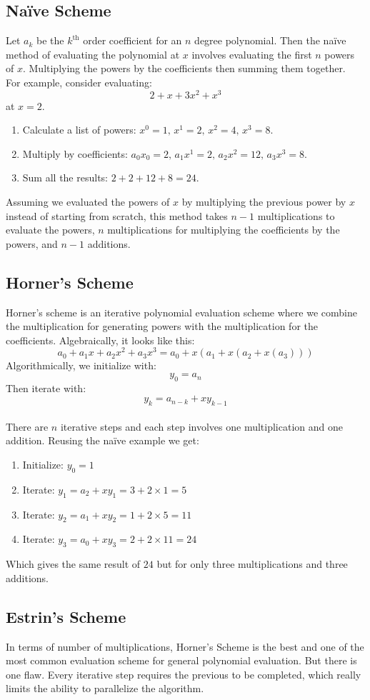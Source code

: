 \subsection{Naïve Scheme}
Let $a_k$ be the $k^\text{th}$ order coefficient for an $n$ degree polynomial.
Then the naïve method of evaluating the polynomial at $x$ involves evaluating the first $n$ powers of $x$.
Multiplying the powers by the coefficients then summing them together.
\\
For example, consider evaluating:
\[2+x+3x^2+x^3\]
at $x=2$.
\begin{enumerate}
	\item Calculate a list of powers: $x^0 = 1,\,x^1 = 2,\,x^2 = 4,\,x^3 = 8$.
	\item Multiply by coefficients: $a_0x_0 = 2,\,a_1x^1 = 2,\,a_2x^2 = 12,\, a_3x^3 = 8$.
	\item Sum all the results: $2+2+12+8 = 24$.
\end{enumerate}
Assuming we evaluated the powers of $x$ by multiplying the previous power by $x$ instead of starting from scratch,
this method takes $n-1$ multiplications to evaluate the powers,
$n$ multiplications for multiplying the coefficients by the powers,
and $n-1$ additions.

\subsection{Horner's Scheme}
Horner's scheme is an iterative polynomial evaluation scheme where we combine the multiplication for generating powers with the multiplication for the coefficients.
Algebraically, it looks like this:
\[a_0+a_1x+a_2x^2+a_3x^3 = a_0+x(a_1+x(a_2+x(a_3)))\]
Algorithmically, we initialize with: 
\[y_0 = a_n\]
Then iterate with:
\[y_k = a_{n-k}+xy_{k-1}\]
\\
There are $n$ iterative steps and each step involves one multiplication and one addition.
Reusing the naïve example we get:
\begin{enumerate}
	\item Initialize: $y_0 = 1$
	\item Iterate: $y_1 = a_2+xy_1 = 3+2\times1 = 5$
	\item Iterate: $y_2 = a_1+xy_2 = 1+2\times5 = 11$
	\item Iterate: $y_3 = a_0+xy_3 = 2+2\times11 = 24$
\end{enumerate}
Which gives the same result of $24$ but for only three multiplications and three additions.

\subsection{Estrin's Scheme}
In terms of number of multiplications, Horner's Scheme is the best and one of the most common evaluation scheme for general polynomial evaluation.
But there is one flaw.
Every iterative step requires the previous to be completed,
which really limits the ability to parallelize the algorithm.
\\

